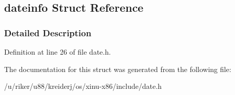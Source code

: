 \hypertarget{structdateinfo}{}\subsection{dateinfo Struct Reference}
\label{structdateinfo}


\subsubsection{Detailed Description}


Definition at line 26 of file date.\+h.



The documentation for this struct was generated from the following file\+:\begin{DoxyCompactItemize}
\item 
/u/riker/u88/kreiderj/os/xinu-\/x86/include/date.\+h\end{DoxyCompactItemize}
